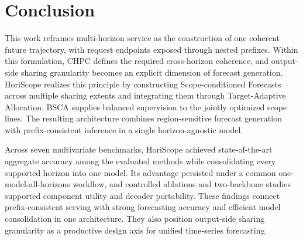 \section{Conclusion}
\label{sec:conclusion}


This work reframes multi-horizon service as the construction of one coherent future trajectory, with request endpoints exposed through nested prefixes. Within this formulation, CHPC defines the required cross-horizon coherence, and output-side sharing granularity becomes an explicit dimension of forecast generation. HoriScope realizes this principle by constructing Scope-conditioned Forecasts across multiple sharing extents and integrating them through Target-Adaptive Allocation. BSCA supplies balanced supervision to the jointly optimized scope lines. The resulting architecture combines region-sensitive forecast generation with prefix-consistent inference in a single horizon-agnostic model.

Across seven multivariate benchmarks, HoriScope achieved state-of-the-art aggregate accuracy among the evaluated methods while consolidating every supported horizon into one model. Its advantage persisted under a common one-model-all-horizons workflow, and controlled ablations and two-backbone studies supported component utility and decoder portability. These findings connect prefix-consistent serving with strong forecasting accuracy and efficient model consolidation in one architecture. They also position output-side sharing granularity as a productive design axis for unified time-series forecasting.
